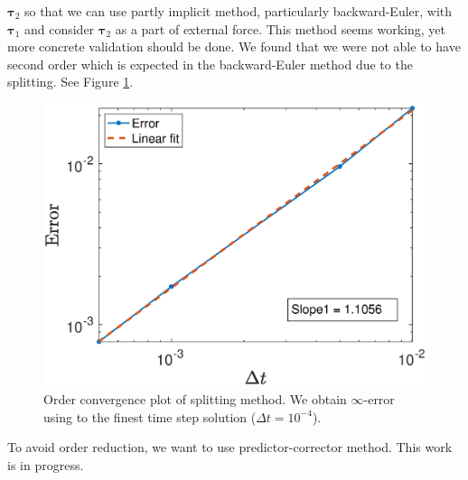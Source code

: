 ${\bm \tau_2}$ so that we can use partly implicit method, particularly backward-Euler, with ${\bm \tau_1}$ and consider ${\bm \tau_2}$ as a part of external force. This method seems working, yet more concrete validation should be done. We found that we were not able to have second order which is expected in the backward-Euler method due to the splitting. See Figure \ref{fig_infError_vel}.
\begin{figure}[ht]
	\begin{center}
	
		\includegraphics[scale=0.5]{figures/fig_infError_vel.eps}
		\caption{Order convergence plot of splitting method. We obtain $\infty$-error using to the finest time step solution ($\Delta t = 10^{-4}$).}
	\label{fig_infError_vel}
	\end{center}
\end{figure}
To avoid order reduction, we want to use predictor-corrector method. This work is in progress.
